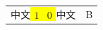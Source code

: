 \documentclass{article}
\begin{document}
\begin{tabular}{cc}
中文\colorbox{yellow}{$\begin{array}{cc}1 &0\end{array}$}中文 & B\\
\end{tabular}
\end{document}
